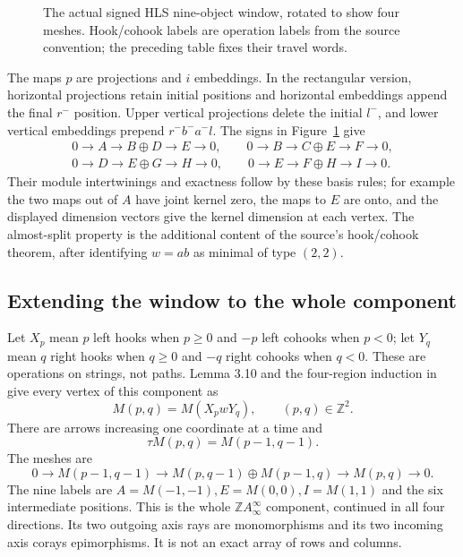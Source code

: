 \documentclass[11pt,oneside,openany]{book}
\theoremstyle{definition}\newtheorem{definition}[theorem]{Definition}
\theoremstyle{remark}\newtheorem{remark}[theorem]{Remark}
\begin{document}
\begin{figure}[htbp]\centering
{}
\caption{The actual signed HLS nine-object window, rotated to show four
meshes. Hook/cohook labels are operation labels from the source convention;
the preceding table fixes their travel words.}
\label{arb:diamond}
\end{figure}
The maps $p$ are projections and $i$ embeddings. In the rectangular version,
horizontal projections retain initial positions and horizontal embeddings
append the final $r^-$ position. Upper vertical projections delete the initial
$l^-$, and lower vertical embeddings prepend $r^-b^-a^-l$. The signs in
Figure~\ref{arb:diamond} give
\[
 \begin{gathered}
 0\to A\to B\oplus D\to E\to0,\qquad
 0\to B\to C\oplus E\to F\to0,\\
 0\to D\to E\oplus G\to H\to0,\qquad
 0\to E\to F\oplus H\to I\to0.
 \end{gathered}
\]
Their module intertwinings and exactness follow by these basis rules; for
example the two maps out of $A$ have joint kernel zero, the maps to $E$ are
onto, and the displayed dimension vectors give the kernel dimension at each
vertex. The almost-split property is the additional content of the source's
hook/cohook theorem, after identifying $w=ab$ as minimal of type $(2,2)$.

\subsection{Extending the window to the whole component}
Let $X_p$ mean $p$ left hooks when $p\ge0$ and $-p$ left cohooks when $p<0$;
let $Y_q$ mean $q$ right hooks when $q\ge0$ and $-q$ right cohooks when $q<0$.
These are operations on strings, not paths. Lemma 3.10 and the four-region
induction in \cite[Proposition 3.12]{ARBHLS} give every vertex of this component as
\[
 M(p,q)=M(X_p wY_q),\qquad (p,q)\in\mathbb Z^2.
\]
There are arrows increasing one coordinate at a time and
\[
 \tau M(p,q)=M(p-1,q-1).
\]
The meshes are
\[
 0\to M(p-1,q-1)\to M(p,q-1)\oplus M(p-1,q)\to M(p,q)\to0.
\]
The nine labels are $A=M(-1,-1),E=M(0,0),I=M(1,1)$ and the six intermediate
positions. This is the whole $\mathbb ZA_\infty^\infty$ component, continued in
all four directions. Its two outgoing axis rays are monomorphisms and its two
incoming axis corays epimorphisms. It is not an exact array of rows and columns.
\end{document}
